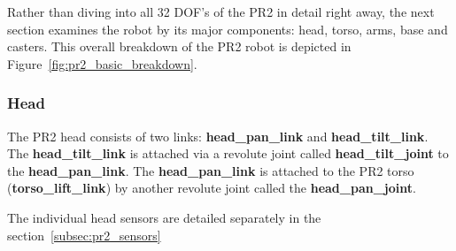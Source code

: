 Rather than diving into all 32 DOF's of the PR2 in detail right away, the next section examines the robot by its major components:  head, torso, arms, base and casters.
This overall breakdown of the PR2 robot is depicted in Figure~\ref{fig:pr2_basic_breakdown}.

\subsubsection{Head}
The PR2 head consists of two links: {\bf head\_pan\_link} and {\bf head\_tilt\_link}.  The {\bf head\_tilt\_link} is attached via a revolute joint called {\bf head\_tilt\_joint} to the {\bf head\_pan\_link}.
The {\bf head\_pan\_link} is attached to the PR2 torso ({\bf torso\_lift\_link}) by another revolute joint called the {\bf head\_pan\_joint}.

The individual head sensors are detailed separately in the section~\ref{subsec:pr2_sensors}

